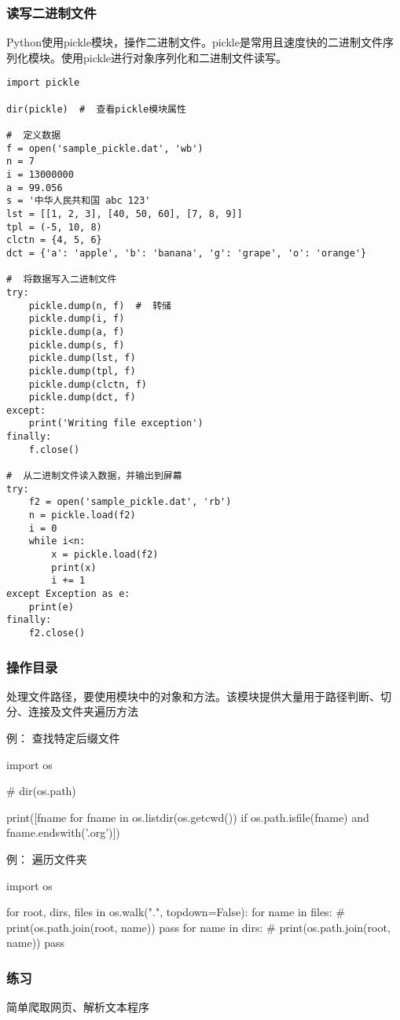 \subsubsection{读写二进制文件}
Python使用pickle模块，操作二进制文件。pickle是常用且速度快的二进制文件序列化模块。使用pickle进行对象序列化和二进制文件读写。

\begin{verbatim}
import pickle

dir(pickle)  #  查看pickle模块属性

#  定义数据
f = open('sample_pickle.dat', 'wb')
n = 7
i = 13000000
a = 99.056
s = '中华人民共和国 abc 123'
lst = [[1, 2, 3], [40, 50, 60], [7, 8, 9]]
tpl = (-5, 10, 8)
clctn = {4, 5, 6}
dct = {'a': 'apple', 'b': 'banana', 'g': 'grape', 'o': 'orange'}

#  将数据写入二进制文件
try:
    pickle.dump(n, f)  #  转储
    pickle.dump(i, f)
    pickle.dump(a, f)
    pickle.dump(s, f)
    pickle.dump(lst, f)
    pickle.dump(tpl, f)
    pickle.dump(clctn, f)
    pickle.dump(dct, f)
except:
    print('Writing file exception')
finally:
    f.close()

#  从二进制文件读入数据，并输出到屏幕
try:
    f2 = open('sample_pickle.dat', 'rb')
    n = pickle.load(f2)
    i = 0
    while i<n:
        x = pickle.load(f2)
        print(x)
        i += 1
except Exception as e:
    print(e)
finally:
    f2.close()
\end{verbatim}
\subsubsection{操作目录}
处理文件路径，要使用模块中的对象和方法。该模块提供大量用于路径判断、切分、连接及文件夹遍历方法

例： 查找特定后缀文件
\begin{python}
import os

# dir(os.path)

print([fname for fname in os.listdir(os.getcwd()) if os.path.isfile(fname) and fname.endswith('.org')])
\end{python}
例： 遍历文件夹
\begin{python}
import os

for root, dirs, files in os.walk(".", topdown=False):
    for name in files:
        #  print(os.path.join(root, name))
        pass
    for name in dirs:
        #  print(os.path.join(root, name))
        pass
\end{python}

\subsubsection{练习}
简单爬取网页、解析文本程序

